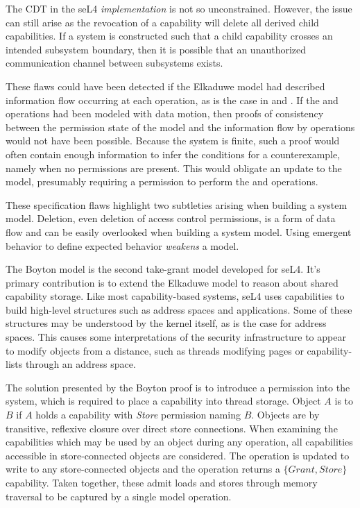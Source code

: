 The CDT in the seL4 \emph{implementation} is not so unconstrained.
However, the issue can still arise as the revocation of a capability will delete all derived child capabilities.
If a system is constructed such that a child capability crosses an intended subsystem boundary, then it is possible that an unauthorized communication channel between subsystems exists.

These flaws could have been detected if the Elkaduwe model had described information flow occurring at each operation, as is the case in \TMSW{} and \TMmodelName{}.
If the  and  operations had been modeled with data motion, then proofs of consistency between the permission state of the model and the information flow by operations would not have been possible.
Because the system is finite, such a proof would often contain enough information to infer the conditions for a counterexample, namely when no permissions are present.
This would obligate an update to the model, presumably requiring a  permission to perform the   and  operations.

These specification flaws highlight two subtleties arising when building a system model.
Deletion, even deletion of access control permissions, is a form of data flow and can be easily overlooked when building a system model.
Using emergent behavior to define expected behavior \emph{weakens} a model.

The Boyton model is the second take-grant model developed for seL4. \cite{Boyton_ssv2009}
It's primary contribution is to extend the Elkaduwe model to reason about shared capability storage.
Like most capability-based systems, seL4 uses capabilities to build high-level structures such as address spaces and applications.
Some of these structures may be understood by the kernel itself, as is the case for address spaces.
This causes some interpretations of the security infrastructure to appear to modify objects from a distance, such as threads modifying pages or capability-lists through an address space.

The solution presented by the Boyton proof is to introduce a  permission into the system, which is required to place a capability into thread storage.
Object \(A\) is  to \(B\) if \(A\) holds a capability with \emph{Store} permission naming \(B\).
Objects are  by transitive, reflexive closure over direct store connections.
When examining the capabilities which may be used by an object during any operation, all capabilities accessible in store-connected objects are considered.
The  operation is updated to write to any store-connected objects and the  operation returns a \(\{Grant,Store\}\) capability.
Taken together, these admit loads and stores through memory traversal to be captured by a single model operation.

